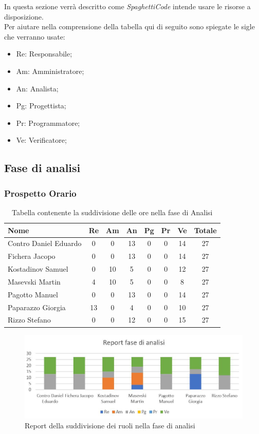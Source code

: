 \documentclass[../piano_di_progetto.tex]{subfiles}
\begin{document}
In questa sezione verrà descritto come \emph{SpaghettiCode} intende usare le risorse a disposizione. \\
Per aiutare nella comprensione della tabella qui di seguito sono spiegate le sigle che verranno usate:
\begin{itemize}
\item Re: Responsabile;
\item Am: Amministratore;
\item An: Analista;
\item Pg: Progettista;
\item Pr: Programmatore;
\item Ve: Verificatore;
\end{itemize}


\subsection{ Fase di analisi}%
\label{sub:fase_analisi}
\subsubsection{Prospetto Orario}


\begin{table}[!ht]
	\centering
	\begin{tabular}{|l|c|c|c|c|c|c|c|}
	\hline
	\rowcolor{lightgray}
	\textbf{Nome} & \textbf{Re} & \textbf{Am} & \textbf{An} & \textbf{Pg}  & \textbf{Pr}   & \textbf{Ve} & \textbf{Totale}\\
	\hline
		Contro Daniel Eduardo & 0 & 0 & 13 & 0 & 0 & 14 & 27 \\
	\hline
		Fichera Jacopo & 0 & 0 & 13 & 0 & 0 & 14 & 27 \\
	\hline
		Kostadinov Samuel & 0 & 10 & 5 & 0 & 0 & 12 & 27 \\			
	\hline
		Masevski Martin & 4 & 10 & 5 & 0 & 0 & 8 & 27 \\
	\hline
		Pagotto Manuel & 0 & 0 & 13 & 0 & 0 & 14 & 27 \\			
	\hline
		Paparazzo Giorgia & 13 & 0 & 4 & 0 & 0 & 10 & 27 \\
	\hline
		Rizzo Stefano & 0 & 0 & 12 & 0 & 0 & 15 & 27 \\
	\hline	
	\end{tabular}
	\caption{Tabella contenente la suddivisione delle ore nella fase di Analisi}
\end{table}

\begin{figure}[H]
\centering
\includegraphics[width=12cm]{componenti/img/report_analisi}
\caption{Report della suddivisione dei ruoli nella fase di analisi}
\end{figure}
\end{document}
